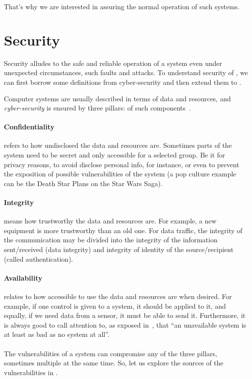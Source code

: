 \documentclass[../main.tex]{subfiles}
\begin{document}
That's why we are interested in assuring the normal operation of such systems.

\section{Security}\label{sec:security}
Security alludes to the safe and reliable operation of a system even under unexpected circumstances, such faults and attacks.
To understand security of \cps{}, we can first borrow some definitions from cyber-security and then extend them to \cps{}.

Computer systems are usually described in terms of data and resources, and \emph{cyber-security} is ensured by three pillars: \CIA{} of such components~\cite{Bishop2002}.

\paragraph{Confidentiality} refers to how undisclosed the data and resources are.
Sometimes parts of the system need to be secret and only accessible for a selected group.
Be it for privacy reasons, to avoid disclose personal info, for instance, or even to prevent the exposition of possible vulnerabilities of the system (a pop culture example can be the Death Star Plans on the Star Wars Saga).

\paragraph{Integrity} means how trustworthy the data and resources are.
For example, a new equipment is more trustworthy than an old one. For data traffic, the integrity of the communication may be divided into the integrity of the information sent/received (data integrity) and integrity of identity of the source/recipient (called authentication).

\paragraph{Availability} relates to how accessible to use the data and resources are when desired.
For example, if one control is given to a system, it should be applied to it, and equally, if we need data from a sensor, it must be able to send it.
Furthermore, it is always good to call attention to, as exposed in~\cite{Bishop2002}, that ``an unavailable system is at least as bad as no system at all''.
\\~\\
The vulnerabilities of a system can compromise any of the three pillars, sometimes multiple at the same time. So, let us explore the sources of the vulnerabilities in \cps{}.
\end{document}

